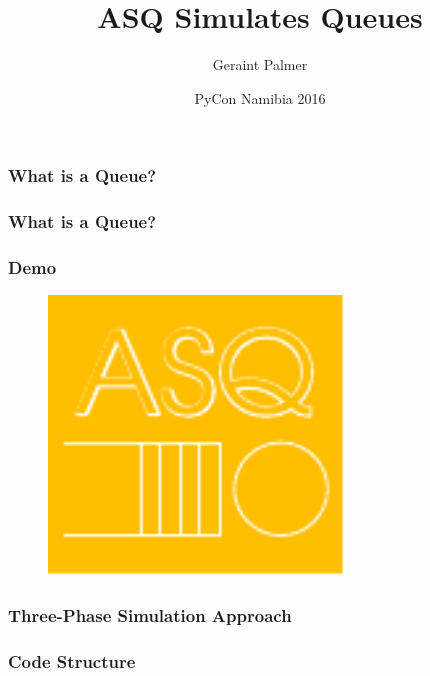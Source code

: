 \documentclass{beamer}
\title
{ASQ Simulates Queues}
\author{Geraint Palmer}
\date{PyCon Namibia 2016}
\begin{document}
\frame{\titlepage}

\begin{frame}
\frametitle{What is a Queue?}
\begin{figure}
  
\end{figure}
\end{frame}

\begin{frame}
\frametitle{What is a Queue?}
\begin{figure}
  
\end{figure}
\end{frame}

\begin{frame}
\frametitle{Demo}
\begin{figure}
	\includegraphics[width=0.7\textwidth]{asq_logo}
\end{figure}
\end{frame}

\begin{frame}
\frametitle{Three-Phase Simulation Approach}
\begin{figure}
	
\end{figure}
\end{frame}

\begin{frame}
\frametitle{Code Structure}
\begin{figure}
	
\end{figure}
\end{frame}
\end{document}
